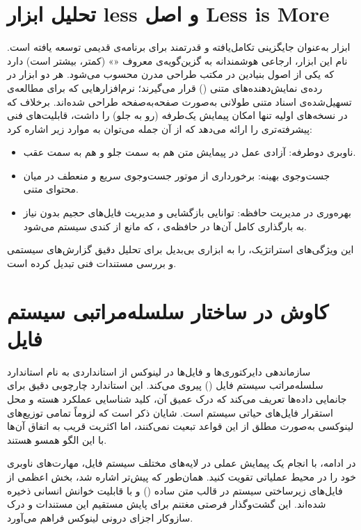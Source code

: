\section{تحلیل ابزار less و اصل Less is More}

ابزار  به‌عنوان جایگزینی تکامل‌یافته و قدرتمند برای برنامه‌ی قدیمی  توسعه یافته است. نام این ابزار، ارجاعی هوشمندانه به گزین‌گویه‌ی معروف «» (کمتر، بیشتر است) دارد که یکی از اصول بنیادین در مکتب طراحی مدرن محسوب می‌شود. هر دو ابزار در رده‌ی نمایش‌دهنده‌های متنی () قرار می‌گیرند؛ نرم‌افزارهایی که برای مطالعه‌ی تسهیل‌شده‌ی اسناد متنی طولانی به‌صورت صفحه‌به‌صفحه طراحی شده‌اند. برخلاف  که در نسخه‌های اولیه تنها امکان پیمایش یک‌طرفه (رو به جلو) را داشت،  قابلیت‌های فنی پیشرفته‌تری را ارائه می‌دهد که از آن جمله می‌توان به موارد زیر اشاره کرد:

\begin{itemize}
  \item ناوبری دوطرفه: آزادی عمل در پیمایش متن هم به سمت جلو و هم به سمت عقب.
  \item جست‌وجوی بهینه: برخورداری از موتور جست‌وجوی سریع و منعطف در میان محتوای متنی.
  \item بهره‌وری در مدیریت حافظه: توانایی بازگشایی و مدیریت فایل‌های حجیم بدون نیاز به بارگذاری کامل آن‌ها در حافظه‌ی ، که مانع از کندی سیستم می‌شود.
\end{itemize}

این ویژگی‌های استراتژیک،  را به ابزاری بی‌بدیل برای تحلیل دقیق گزارش‌های سیستمی و بررسی مستندات فنی تبدیل کرده است.

\section{کاوش در ساختار سلسله‌مراتبی سیستم فایل}

سازماندهی دایرکتوری‌ها و فایل‌ها در لینوکس از استانداردی به نام استاندارد سلسله‌مراتب سیستم فایل () پیروی می‌کند. این استاندارد چارچوبی دقیق برای جانمایی داده‌ها تعریف می‌کند که درک عمیق آن، کلید شناسایی عملکرد هسته و محل استقرار فایل‌های حیاتی سیستم است. شایان ذکر است که لزوماً تمامی توزیع‌های لینوکسی به‌صورت مطلق از این قواعد تبعیت نمی‌کنند، اما اکثریت قریب به اتفاق آن‌ها با این الگو همسو هستند.

در ادامه، با انجام یک پیمایش عملی در لایه‌های مختلف سیستم‌ فایل، مهارت‌های ناوبری خود را در محیط عملیاتی تقویت کنید. همان‌طور که پیش‌تر اشاره شد، بخش اعظمی از فایل‌های زیرساختی سیستم در قالب متن ساده () و با قابلیت خوانش انسانی ذخیره شده‌اند. این گشت‌و‌گذار فرصتی مغتنم برای پایش مستقیم این مستندات و درک سازوکار اجزای درونی لینوکس فراهم می‌آورد.

